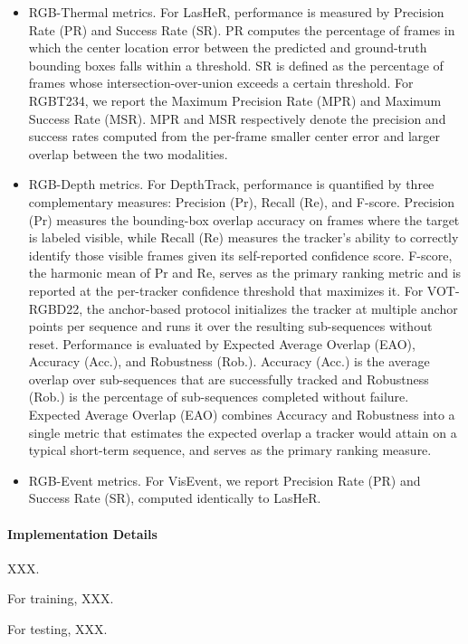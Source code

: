 \begin{itemize}
    \item RGB-Thermal metrics. For LasHeR, performance is measured by Precision Rate (PR) and Success Rate (SR). 
    PR computes the percentage of frames in which the center location error between the predicted and ground-truth bounding boxes falls within a threshold. 
    SR is defined as the percentage of frames whose intersection-over-union exceeds a certain threshold. 
    For RGBT234, we report the Maximum Precision Rate (MPR) and Maximum Success Rate (MSR). 
    MPR and MSR respectively denote the precision and success rates computed from the per-frame smaller center error and larger overlap between the two modalities.
    \item RGB-Depth metrics. 
    For DepthTrack, performance is quantified by three complementary measures: Precision (Pr), Recall (Re), and F-score. Precision (Pr) measures the bounding-box overlap accuracy on frames where the target is labeled visible, while Recall (Re) measures the tracker's ability to correctly identify those visible frames given its self-reported confidence score. F-score, the harmonic mean of Pr and Re, serves as the primary ranking metric and is reported at the per-tracker confidence threshold that maximizes it.
    For VOT-RGBD22, the anchor-based protocol initializes the tracker at multiple anchor points per sequence and runs it over the resulting sub-sequences without reset. Performance is evaluated by Expected Average Overlap (EAO), Accuracy (Acc.), and Robustness (Rob.). Accuracy (Acc.) is the average overlap over sub-sequences that are successfully tracked and Robustness (Rob.) is the percentage of sub-sequences completed without failure. Expected Average Overlap (EAO) combines Accuracy and Robustness into a single metric that estimates the expected overlap a tracker would attain on a typical short-term sequence, and serves as the primary ranking measure.
    \item RGB-Event metrics. For VisEvent, we report Precision Rate (PR) and Success Rate (SR), computed identically to LasHeR.
\end{itemize}

\paragraph*{Implementation Details}
XXX.

For training, XXX.

For testing, XXX.



